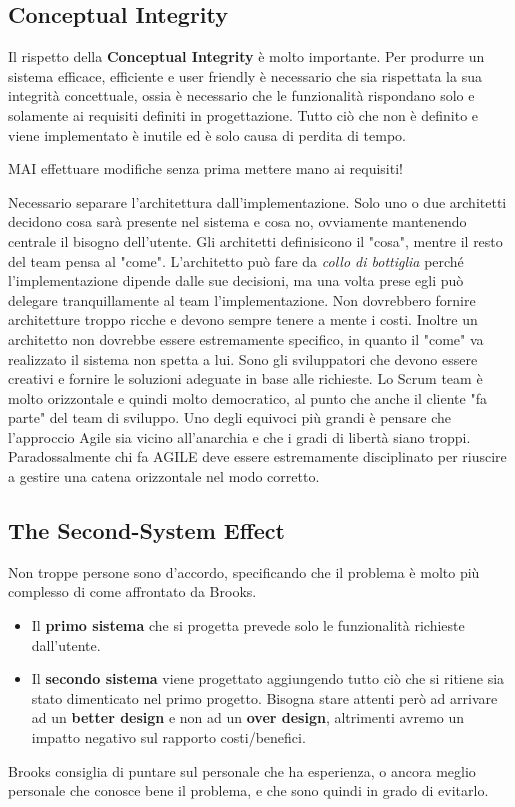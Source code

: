 \subsection{Conceptual Integrity}
Il rispetto della \textbf{Conceptual Integrity} è molto importante. Per produrre un sistema efficace, efficiente e user friendly è necessario che sia rispettata la sua integrità concettuale, ossia è necessario che le funzionalità rispondano solo e solamente ai requisiti definiti in progettazione. Tutto ciò che non è definito e viene implementato è inutile ed è solo causa di perdita di tempo.
\begin{warn}
	MAI effettuare modifiche senza prima mettere mano ai requisiti!
\end{warn}
Necessario separare l'architettura dall'implementazione. Solo uno o due architetti decidono cosa sarà presente nel sistema e cosa no, ovviamente mantenendo centrale il bisogno dell'utente. Gli architetti definisicono il "cosa", mentre il resto del team pensa al "come". L'architetto può fare da \textit{collo di bottiglia} perché l'implementazione dipende dalle sue decisioni, ma una volta prese egli può delegare tranquillamente al team l'implementazione. Non dovrebbero fornire architetture troppo ricche e devono sempre tenere a mente i costi. Inoltre un architetto non dovrebbe essere estremamente specifico, in quanto il "come" va realizzato il sistema non spetta a lui. Sono gli sviluppatori che devono essere creativi e fornire le soluzioni adeguate in base alle richieste.\newline
Lo Scrum team è molto orizzontale e quindi molto democratico, al punto che anche il cliente "fa parte" del team di sviluppo. Uno degli equivoci più grandi è pensare che l'approccio Agile sia vicino all'anarchia e che i gradi di libertà siano troppi. Paradossalmente chi fa AGILE deve essere estremamente disciplinato per riuscire a gestire una catena orizzontale nel modo corretto.
\subsection{The Second-System Effect}
Non troppe persone sono d'accordo, specificando che il problema è molto più complesso di come affrontato da Brooks.
\begin{itemize}
	\item Il \textbf{primo sistema} che si progetta prevede solo le funzionalità richieste dall'utente.
	\item Il \textbf{secondo sistema} viene progettato aggiungendo tutto ciò che si ritiene sia stato dimenticato nel primo progetto. Bisogna stare attenti però ad arrivare ad un \textbf{better design} e non ad un \textbf{over design}, altrimenti avremo un impatto negativo sul rapporto costi/benefici.
\end{itemize}
Brooks consiglia di puntare sul personale che ha esperienza, o ancora meglio personale che conosce bene il problema, e che sono quindi in grado di evitarlo.
